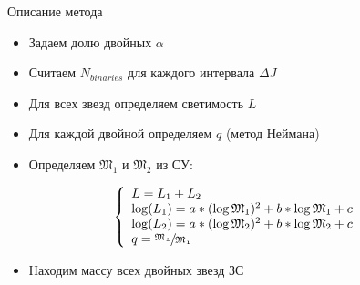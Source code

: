 \documentclass[pdf]{beamer}
\begin{document}
	\begin{frame}{Описание метода}
		\begin{itemize}
			\item Задаем долю двойных $\alpha$
			\item Считаем $N_{binaries}$ для каждого интервала $\Delta J$
			\item Для всех звезд определяем светимость $L$ 
			\item Для каждой двойной определяем $q$ (метод Неймана)
		
			\pause
			\item Определяем $\mathfrak{M_1}$ и $\mathfrak{M_2}$ из СУ:
		\end{itemize}
		
		\[		
		\left\{ 
			\begin{array}{l}
				L=L_1+L_2 \\
				\log(L_1)=a*(\log\mathfrak{M}_1)^2+b*\log\mathfrak{M}_1+c\\
				\log(L_2)=a*(\log\mathfrak{M}_2)^2+b*\log\mathfrak{M}_2+c \\
				q = \sfrac{\mathfrak{M_2}}{\mathfrak{M_1}}
			\end{array}
		\right.
		\]
		\begin{itemize}
			\item Находим массу всех двойных звезд ЗС
		\end{itemize}
	\end{frame}
\end{document}
